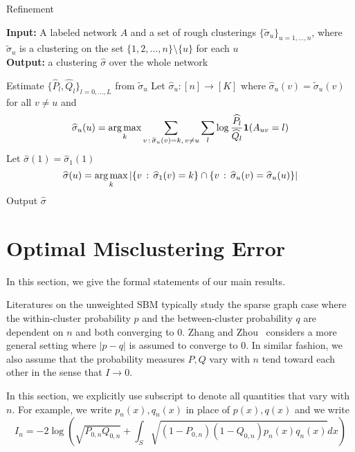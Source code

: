 \documentclass{article}
\begin{document}
\begin{algorithm}
\caption{Refinement}
\label{alg:refinement}
\textbf{Input:} A labeled network $A$ and a set of rough clusterings $\{\tilde{\sigma}_u\}_{u=1, \dots, n}$, where $\tilde \sigma_u$ is a clustering on the set $\{1, 2, \dots, n\} \setminus \{u\}$ for each $u$ \\
\textbf{Output:} a clustering $\hat{\sigma}$ over the whole network

\begin{algorithmic}[1]
   \State Estimate $\{ \hat{P}_l, \hat{Q}_l\}_{l=0,...,L}$ from $\tilde{\sigma}_u$
   \State Let $\hat{\sigma}_u : [n] \rightarrow [K]$ where 
       $\hat{\sigma}_u(v) = \tilde{\sigma}_u(v)$ for all $v \neq u$ and 
   \[
    \widehat{\sigma}_u(u) = \mathop{\text{\rm arg\,max}}_k \sum_{v \,:\, \widetilde{\sigma}_u(v) = k ,\, v\neq u} 
         \sum_l \log \frac{\widehat{P}_l}{\widehat{Q}_l} \mbox{\boldmath $1$}(A_{uv} = l) 
     \]    
\EndFor 
\State Let $\hat{\sigma}(1) = \hat{\sigma}_1(1)$  
\[
\widehat{\sigma}(u) = \mathop{\text{\rm arg\,max}}_k | \{ v \,:\,  \widehat{\sigma}_1(v) = k \} \cap
                                 \{ v \,:\, \widehat{\sigma}_u(v) = \widehat{\sigma}_u(u) \}|
\]
\EndFor
\State Output $\hat{\sigma}$
\end{algorithmic}

\end{algorithm}




\section{Optimal Misclustering Error}
\label{sec:rate}

In this section, we give the formal statements of our main results. 

Literatures on the unweighted SBM typically study the sparse graph case where the within-cluster probability $p$ and the between-cluster probability $q$ are dependent on $n$ and both converging to 0. Zhang and Zhou~\cite{zhangminimax} considers a more general setting where $|p - q|$ is assumed to converge to 0. In similar fashion, we also assume that the probability measures $P, Q$ vary with $n$ tend toward each other in the sense that $I \rightarrow 0$.

In this section, we explicitly use subscript to denote all quantities that vary with $n$. For example, we write $p_n(x), q_n(x)$ in place of $p(x), q(x)$ and we write
\[
  I_n = -2 \log \left( \sqrt{P_{0,n} Q_{0,n}} + \int_S \sqrt{(1-P_{0,n})(1-Q_{0,n})p_n(x) q_n(x)} dx \right)
\]
\end{document}
